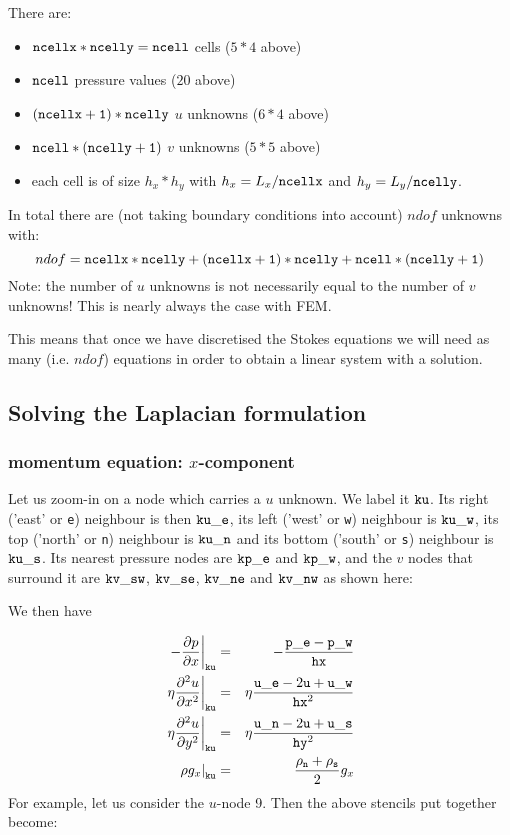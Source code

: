 There are:
\begin{itemize}
\item ${\tt ncellx}*{\tt ncelly}={\tt ncell}$ cells ($5*4$ above)
\item ${\tt ncell}$ pressure values ($20$ above)
\item ${\tt (ncellx+1)}*{\tt ncelly}$ $u$ unknowns ($6*4$ above) 
\item ${\tt ncell}*{\tt (ncelly+1)}$ $v$ unknowns ($5*5$ above) 
\item each cell is of size $h_x * h_y$ with $h_x=L_x/{\tt ncellx}$ 
and $h_y=L_y/{\tt ncelly}$.
\end{itemize}
In total there are (not taking boundary conditions into account)
$ndof$ unknowns with:
\[
ndof= {\tt ncellx}*{\tt ncelly} 
+ {\tt (ncellx+1)}*{\tt ncelly}
+ {\tt ncell}*{\tt (ncelly+1)}
\]
Note: the number of $u$ unknowns is not necessarily equal to the number of $v$
unknowns! This is nearly always the case with FEM. 

This means that once we have discretised the Stokes equations we will need
as many (i.e. $ndof$) equations in order to obtain a linear system with a solution.

\subsection{Solving the Laplacian formulation}

\subsubsection{momentum equation: $x$-component}

Let us zoom-in on a node which carries a $u$ unknown. 
We label it ${\tt ku}$. Its right ('east' or {\tt e})  neighbour is then ${\tt ku\_e}$,
its left ('west' or {\tt w}) neighbour is ${\tt ku\_w}$, 
its top ('north' or {\tt n}) neighbour is ${\tt ku\_n}$ and 
its bottom ('south' or {\tt s}) neighbour is ${\tt ku\_s}$.
Its nearest pressure nodes are ${\tt kp\_e}$ and ${\tt kp\_w}$, and the $v$ nodes
that surround it are ${\tt kv\_sw}$, ${\tt kv\_se}$, ${\tt kv\_ne}$ and ${\tt kv\_nw}$
as shown here:



We then have

\begin{eqnarray}
\left. -\frac{\partial p}{\partial x} \right|_{\tt ku}
&=& -\frac{{\tt p\_e}-{\tt p\_w}}{\tt hx}       \nonumber\\
\left. \eta \frac{\partial^2 u}{\partial x^2} \right|_{\tt ku}
&=& \eta \frac{{\tt u\_e} -2{\tt u}+{\tt u\_w}}{{\tt hx}^2}  \nonumber\\
\left. \eta \frac{\partial^2 u}{\partial y^2} \right|_{\tt ku}
&=& \eta \frac{{\tt u\_n}-2{\tt u}+{\tt u\_s}}{{\tt hy}^2}  \nonumber\\
\left. \rho g_x \right|_{\tt ku} 
&=& \frac{\rho_{\tt n} + \rho_{\tt s}}{2} g_x   \nonumber
\end{eqnarray}
For example, let us consider the $u$-node 9. Then the above stencils put together become:

